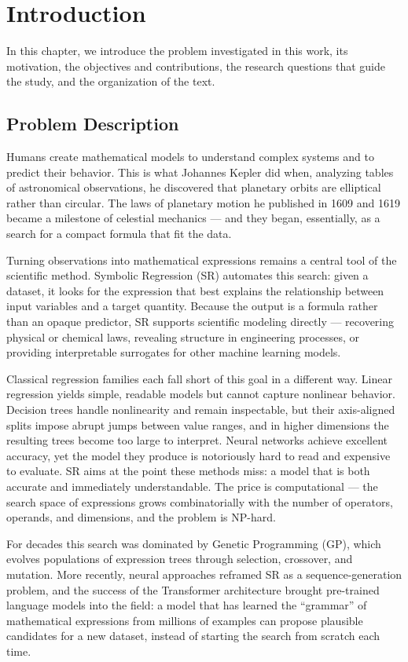 \chapter{Introduction}
\label{ch:introduction}

In this chapter, we introduce the problem investigated in this work, its motivation, the objectives and contributions, the research questions that guide the study, and the organization of the text.

\section{Problem Description}

Humans create mathematical models to understand complex systems and to predict their behavior. This is what Johannes Kepler did when, analyzing tables of astronomical observations, he discovered that planetary orbits are elliptical rather than circular. The laws of planetary motion he published in 1609 and 1619 became a milestone of celestial mechanics --- and they began, essentially, as a search for a compact formula that fit the data.

Turning observations into mathematical expressions remains a central tool of the scientific method. Symbolic Regression (SR) automates this search: given a dataset, it looks for the expression that best explains the relationship between input variables and a target quantity. Because the output is a formula rather than an opaque predictor, SR supports scientific modeling directly --- recovering physical or chemical laws, revealing structure in engineering processes, or providing interpretable surrogates for other machine learning models.

Classical regression families each fall short of this goal in a different way. Linear regression yields simple, readable models but cannot capture nonlinear behavior. Decision trees handle nonlinearity and remain inspectable, but their axis-aligned splits impose abrupt jumps between value ranges, and in higher dimensions the resulting trees become too large to interpret. Neural networks achieve excellent accuracy, yet the model they produce is notoriously hard to read and expensive to evaluate. SR aims at the point these methods miss: a model that is both accurate and immediately understandable. The price is computational --- the search space of expressions grows combinatorially with the number of operators, operands, and dimensions, and the problem is NP-hard.

For decades this search was dominated by Genetic Programming (GP), which evolves populations of expression trees through selection, crossover, and mutation. More recently, neural approaches reframed SR as a sequence-generation problem, and the success of the Transformer architecture brought pre-trained language models into the field: a model that has learned the ``grammar'' of mathematical expressions from millions of examples can propose plausible candidates for a new dataset, instead of starting the search from scratch each time.

